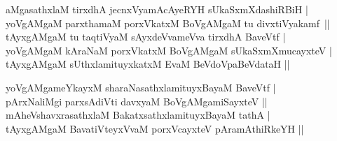 
\begin{entry}
\smallskip
\begin{shl}
aMgasathxlaM tirxdhA jecnxVyamAcAyeRYH sUkaSxmXdashiRBiH |\\
yoVgAMgaM parxthamaM porxVkatxM BoVgAMgaM tu divxtiVyakamf~||\\
tAyxgAMgaM tu taqtiVyaM sAyxdeVvameVva tirxdhA BaveVtf |\\
yoVgAMgaM kAraNaM porxVkatxM BoVgAMgaM sUkaSxmXmucayxteV |\\
tAyxgAMgaM sUthxlamituyxkatxM EvaM BeVdoVpaBeVdataH ||
\end{shl}
\medskip
{}
\smallskip
\begin{shl}
yoVgAMgameYkayxM sharaNasathxlamituyxBayaM BaveVtf |\\[1pt]
pArxNaliMgi parxsAdiVti davxyaM BoVgAMgamiSayxteV ||\\[1pt]
mAheVshavxrasathxlaM BakatxsathxlamituyxBayaM tathA |\\[1pt]
tAyxgAMgaM BavatiVteyxVvaM porxVcayxteV pAramAthiRkeYH ||
\end{shl}
\medskip
{}
\end{entry}

